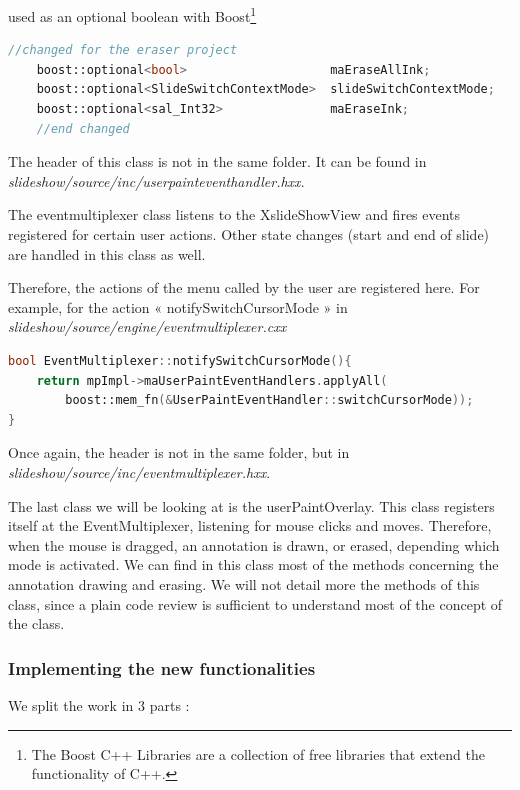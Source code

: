 \documentclass[a4paper,11pt]{article}
\begin{document}
used as an optional boolean with Boost\footnote{The Boost C++ Libraries are a collection of free libraries that extend the functionality of C++.}

\begin{lstlisting}[language=C++]
    //changed for the eraser project
    boost::optional<bool>                    maEraseAllInk;
    boost::optional<SlideSwitchContextMode>  slideSwitchContextMode;
    boost::optional<sal_Int32>               maEraseInk;
    //end changed
\end{lstlisting}

The header of this class is not in the same folder. It can be found in \emph{slideshow/source/inc/userpainteventhandler.hxx}.


The eventmultiplexer class listens to the XslideShowView and fires events registered for certain user actions. Other state changes (start and end of slide) are handled in this class as well.

Therefore, the actions of the menu called by the user are registered here. For example, for the action « notifySwitchCursorMode » in \emph{slideshow/source/engine/eventmultiplexer.cxx}

\begin{lstlisting}[language=C++]
bool EventMultiplexer::notifySwitchCursorMode(){
    return mpImpl->maUserPaintEventHandlers.applyAll(
	    boost::mem_fn(&UserPaintEventHandler::switchCursorMode));
}
\end{lstlisting}

Once again, the header is not in the same folder, but in \emph{slideshow/source/inc/eventmultiplexer.hxx}.

The last class we will be looking at is the userPaintOverlay. This class registers itself at the EventMultiplexer, listening for mouse clicks and moves. Therefore, when the mouse is dragged, an annotation is drawn, or erased, depending which mode is activated. We can find in this class most of the methods concerning the annotation drawing and erasing. We will not detail more the methods of this class, since a plain code review is sufficient to understand most of the concept of the class.


\subsubsection*{Implementing the new functionalities}

We split the work in 3 parts :
\end{document}

